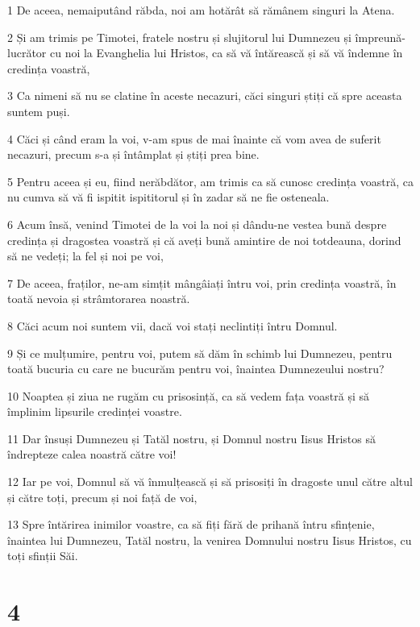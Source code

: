 \par 1 De aceea, nemaiputând răbda, noi am hotărât să rămânem singuri la Atena.
\par 2 Și am trimis pe Timotei, fratele nostru și slujitorul lui Dumnezeu și împreună-lucrător cu noi la Evanghelia lui Hristos, ca să vă întărească și să vă îndemne în credința voastră,
\par 3 Ca nimeni să nu se clatine în aceste necazuri, căci singuri știți că spre aceasta suntem puși.
\par 4 Căci și când eram la voi, v-am spus de mai înainte că vom avea de suferit necazuri, precum s-a și întâmplat și știți prea bine.
\par 5 Pentru aceea și eu, fiind nerăbdător, am trimis ca să cunosc credința voastră, ca nu cumva să vă fi ispitit ispititorul și în zadar să ne fie osteneala.
\par 6 Acum însă, venind Timotei de la voi la noi și dându-ne vestea bună despre credința și dragostea voastră și că aveți bună amintire de noi totdeauna, dorind să ne vedeți; la fel și noi pe voi,
\par 7 De aceea, fraților, ne-am simțit mângâiați întru voi, prin credința voastră, în toată nevoia și strâmtorarea noastră.
\par 8 Căci acum noi suntem vii, dacă voi stați neclintiți întru Domnul.
\par 9 Și ce mulțumire, pentru voi, putem să dăm în schimb lui Dumnezeu, pentru toată bucuria cu care ne bucurăm pentru voi, înaintea Dumnezeului nostru?
\par 10 Noaptea și ziua ne rugăm cu prisosință, ca să vedem fața voastră și să împlinim lipsurile credinței voastre.
\par 11 Dar însuși Dumnezeu și Tatăl nostru, și Domnul nostru Iisus Hristos să îndrepteze calea noastră către voi!
\par 12 Iar pe voi, Domnul să vă înmulțească și să prisosiți în dragoste unul către altul și către toți, precum și noi față de voi,
\par 13 Spre întărirea inimilor voastre, ca să fiți fără de prihană întru sfințenie, înaintea lui Dumnezeu, Tatăl nostru, la venirea Domnului nostru Iisus Hristos, cu toți sfinții Săi.

\chapter{4}

